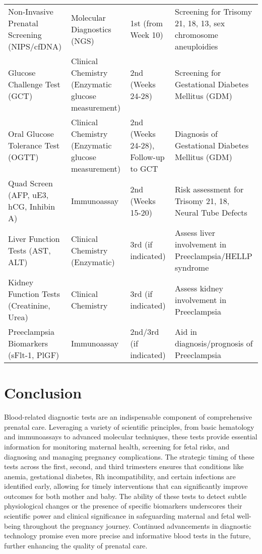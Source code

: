 \documentclass{article}
\begin{document}
\begin{longtable}{|p{3cm}|p{4.5cm}|p{3cm}|p{4.5cm}|}
\addlinespace
Non-Invasive Prenatal Screening (NIPS/cfDNA) & Molecular Diagnostics (NGS) & 1st (from Week 10) & Screening for Trisomy 21, 18, 13, sex chromosome aneuploidies \\
\addlinespace
Glucose Challenge Test (GCT) & Clinical Chemistry (Enzymatic glucose measurement) & 2nd (Weeks 24-28) & Screening for Gestational Diabetes Mellitus (GDM) \\
\addlinespace
Oral Glucose Tolerance Test (OGTT) & Clinical Chemistry (Enzymatic glucose measurement) & 2nd (Weeks 24-28), Follow-up to GCT & Diagnosis of Gestational Diabetes Mellitus (GDM) \\
\addlinespace
Quad Screen (AFP, uE3, hCG, Inhibin A) & Immunoassay & 2nd (Weeks 15-20) & Risk assessment for Trisomy 21, 18, Neural Tube Defects \\
\addlinespace
Liver Function Tests (AST, ALT) & Clinical Chemistry (Enzymatic) & 3rd (if indicated) & Assess liver involvement in Preeclampsia/HELLP syndrome \\
\addlinespace
Kidney Function Tests (Creatinine, Urea) & Clinical Chemistry & 3rd (if indicated) & Assess kidney involvement in Preeclampsia \\
\addlinespace
Preeclampsia Biomarkers (sFlt-1, PlGF) & Immunoassay & 2nd/3rd (if indicated) & Aid in diagnosis/prognosis of Preeclampsia \\
\end{longtable}

\section{Conclusion}
Blood-related diagnostic tests are an indispensable component of comprehensive prenatal care. Leveraging a variety of scientific principles, from basic hematology and immunoassays to advanced molecular techniques, these tests provide essential information for monitoring maternal health, screening for fetal risks, and diagnosing and managing pregnancy complications. The strategic timing of these tests across the first, second, and third trimesters ensures that conditions like anemia, gestational diabetes, Rh incompatibility, and certain infections are identified early, allowing for timely interventions that can significantly improve outcomes for both mother and baby. The ability of these tests to detect subtle physiological changes or the presence of specific biomarkers underscores their scientific power and clinical significance in safeguarding maternal and fetal well-being throughout the pregnancy journey. Continued advancements in diagnostic technology promise even more precise and informative blood tests in the future, further enhancing the quality of prenatal care.
\end{document}
